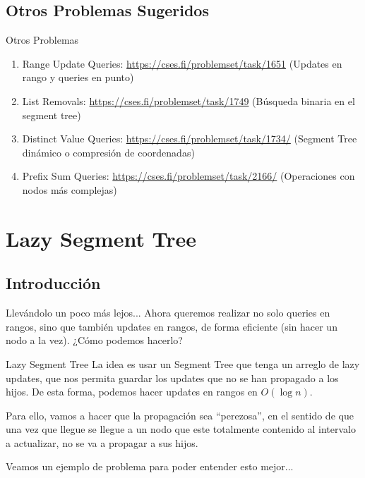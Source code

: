 \documentclass{beamer}
\begin{document}
\subsection{Otros Problemas Sugeridos}

\begin{frame}{Otros Problemas}
\begin{enumerate}
    \item Range Update Queries: \url{https://cses.fi/problemset/task/1651} (Updates en rango y queries en punto)
    \item List Removals: \url{https://cses.fi/problemset/task/1749} (Búsqueda binaria en el segment tree)
    \item Distinct Value Queries: \url{https://cses.fi/problemset/task/1734/} (Segment Tree dinámico o compresión de coordenadas)
    \item Prefix Sum Queries: \url{https://cses.fi/problemset/task/2166/} (Operaciones con nodos más complejas) 
\end{enumerate}
\end{frame}

\section{Lazy Segment Tree}
\subsection{Introducción}

\begin{frame}{Llevándolo un poco más lejos...}
Ahora queremos realizar no solo queries en rangos, sino que también updates en rangos, de forma eficiente (sin hacer un nodo a la vez). ¿Cómo podemos hacerlo?
\end{frame}

\begin{frame}{Lazy Segment Tree}
La idea es usar un Segment Tree que tenga un arreglo de lazy updates, que nos permita guardar los updates que no se han propagado a los hijos. De esta forma, podemos hacer updates en rangos en $O(\log n)$.

\pause
Para ello, vamos a hacer que la propagación sea ``perezosa'', en el sentido de que una vez que llegue se llegue a un nodo que este totalmente contenido al intervalo a actualizar, no se va a propagar a sus hijos.

\pause
Veamos un ejemplo de problema para poder entender esto mejor...
\end{frame}
\end{document}
